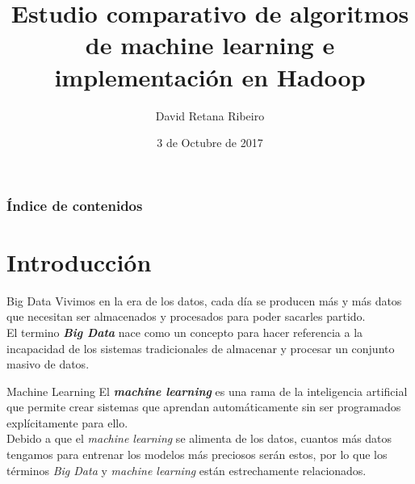 \documentclass{beamer}
\title[Machine Learning y Big Data]{Estudio comparativo de algoritmos de machine learning e implementación en Hadoop}
\author{David Retana Ribeiro}
\institute[UCM]{Universidad Complutense de Madrid \\ \medskip \texttt{davidret@ucm.es}}
\date{3 de Octubre de 2017}
\begin{document}

\begin{frame} %
\titlepage
\end{frame}


\begin{frame} %
\frametitle{Índice de contenidos}
\tableofcontents
\end{frame}


\section{Introducción}

\begin{frame} %
  \begin{block}{Big Data}
  Vivimos en la era de los datos, cada día se producen más y más datos  que necesitan ser almacenados y
  procesados para poder sacarles partido.\\
  El termino \textbf{\textit{Big Data}} nace como un concepto para hacer referencia a la incapacidad de 
  los sistemas tradicionales de almacenar y procesar un conjunto masivo de datos.
  \end{block}
  
  \begin{block}{Machine Learning}
  El \textbf{\textit{machine learning}} es una rama de la inteligencia artificial que permite crear sistemas que 
  aprendan automáticamente sin ser programados explícitamente para ello.\\
  Debido a que el \textit{machine learning} se alimenta de los datos, cuantos más datos tengamos para
  entrenar los modelos más preciosos serán estos, por lo que los términos \textit{Big Data} y \textit{machine learning}
  están estrechamente relacionados.
  \end{block}
\end{frame}

\end{document}

